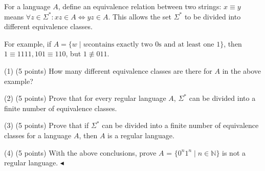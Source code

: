 \documentclass[11pt]{article}
\newenvironment{problem}[2][Problem]{\begin{trivlist}
		\item[\hskip \labelsep {\bfseries #1}\hskip \labelsep {\bfseries #2.}]}{\hfill$\blacktriangleleft$\end{trivlist}}
\begin{document}
	\begin{problem}{4.(20 points)}
		For a language $A$, define an equivalence relation between two strings: $x \equiv y$ means
		$\forall z\in\Sigma^* : xz\in A\Leftrightarrow yz\in A$. This allows the set $\Sigma^*$
		to be divided into different equivalence
		classes.
		
		For example, if $A = \{w \mid w \mbox{contains exactly two }0\mbox{s and at least one }1\}$, then $1\equiv1111, 101\equiv110$, but $1\not\equiv011$.
		
		(1) (5 points) How many different equivalence classes are there for $A$ in the above example?
		
		(2) (5 points) Prove that for every regular language $A$, $\Sigma^*$ can be divided into a finite number of equivalence classes.
		
		(3) (5 points) Prove that if $\Sigma^*$ can be divided into a finite number of equivalence classes for a language $A$, then $A$ is a regular language.
		
		(4) (5 points) With the above conclusions, prove $A$ = $\{0^n1^n\mid n\in\mathbb{N}\}$ is not a regular language.
	\end{problem}
\end{document}
